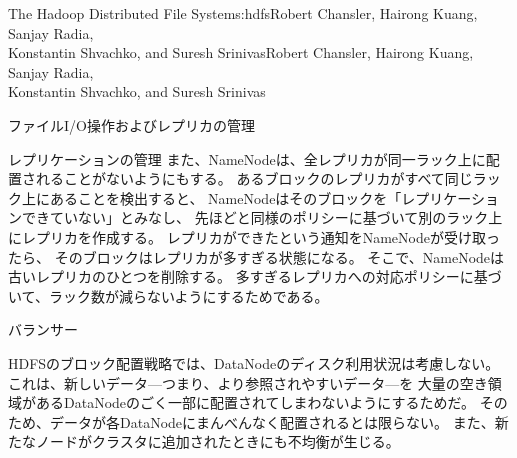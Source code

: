 \begin{aosachaptertoc}{The Hadoop Distributed File System}{s:hdfs}{Robert Chansler, Hairong Kuang, Sanjay Radia, \\ Konstantin Shvachko, and Suresh Srinivas}{Robert Chansler, Hairong Kuang, Sanjay Radia, \\ \hspace*{0.9cm} Konstantin Shvachko, and Suresh Srinivas}
\begin{aosasect1}{ファイルI/O操作およびレプリカの管理}
\begin{aosasect2}{レプリケーションの管理}
また、NameNodeは、全レプリカが同一ラック上に配置されることがないようにもする。
あるブロックのレプリカがすべて同じラック上にあることを検出すると、
NameNodeはそのブロックを「レプリケーションできていない」とみなし、
先ほどと同様のポリシーに基づいて別のラック上にレプリカを作成する。
レプリカができたという通知をNameNodeが受け取ったら、
そのブロックはレプリカが多すぎる状態になる。
そこで、NameNodeは古いレプリカのひとつを削除する。
多すぎるレプリカへの対応ポリシーに基づいて、ラック数が減らないようにするためである。

\end{aosasect2}

\begin{aosasect2}{バランサー}

HDFSのブロック配置戦略では、DataNodeのディスク利用状況は考慮しない。
これは、新しいデータ---つまり、より参照されやすいデータ---を
大量の空き領域があるDataNodeのごく一部に配置されてしまわないようにするためだ。
そのため、データが各DataNodeにまんべんなく配置されるとは限らない。
また、新たなノードがクラスタに追加されたときにも不均衡が生じる。


\end{aosasect2}
\end{aosasect1}
\end{aosachaptertoc}
